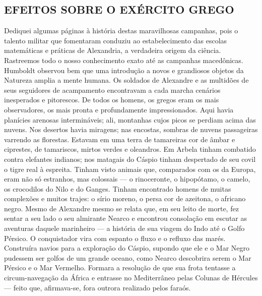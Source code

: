 \documentclass[11pt,a5paper,twoside,openany]{book}
\begin{document}
\subsection*{EFEITOS SOBRE O EXÉRCITO GREGO}
Dediquei algumas páginas à história destas maravilhosas campanhas, pois o talento militar que fomentaram conduziu ao estabelecimento das escolas matemáticas e práticas de Alexandria, a verdadeira origem da ciência. Rastreemos todo o nosso conhecimento exato até as campanhas macedônicas. Humboldt observou bem que uma introdução a novos e grandiosos objetos da Natureza amplia a mente humana. Os soldados de Alexandre e as multidões de seus seguidores de acampamento encontravam a cada marcha cenários inesperados e pitorescos. De todos os homens, os gregos eram os mais observadores, os mais pronta e profundamente impressionados. Aqui havia planícies arenosas intermináveis; ali, montanhas cujos picos se perdiam acima das nuvens. Nos desertos havia miragens; nas encostas, sombras de nuvens passageiras varrendo as florestas. Estavam em uma terra de tamareiras cor de âmbar e ciprestes, de tamariscos, mirtos verdes e oleandros. Em Arbela tinham combatido contra elefantes indianos; nos matagais do Cáspio tinham despertado de seu covil o tigre real à espreita. Tinham visto animais que, comparados com os da Europa, eram não só estranhos, mas colossais — o rinoceronte, o hipopótamo, o camelo, os crocodilos do Nilo e do Ganges. Tinham encontrado homens de muitas complexões e muitos trajes: o sírio moreno, o persa cor de azeitona, o africano negro. Mesmo de Alexandre mesmo se relata que, em seu leito de morte, fez sentar a seu lado o seu almirante Nearco e encontrou consolação em escutar as aventuras daquele marinheiro — a história de sua viagem do Indo até o Golfo Pérsico. O conquistador vira com espanto o fluxo e o refluxo das marés. Construíra navios para a exploração do Cáspio, supondo que ele e o Mar Negro pudessem ser golfos de um grande oceano, como Nearco descobrira serem o Mar Pérsico e o Mar Vermelho. Formara a resolução de que sua frota tentasse a circum-navegação da África e entrasse no Mediterrâneo pelas Colunas de Hércules — feito que, afirmava-se, fora outrora realizado pelos faraós.
\end{document}
